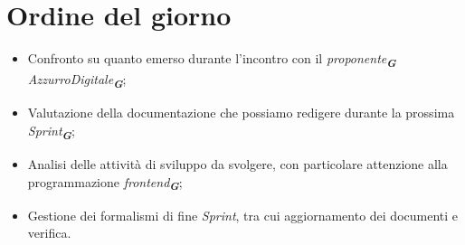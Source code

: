 

\section{Ordine del giorno}

\begin{itemize}
    \item Confronto su quanto emerso durante l'incontro con il \emph{proponente}\textsubscript{\textit{\textbf{G}}} \emph{AzzurroDigitale}\textsubscript{\textit{\textbf{G}}};
    \item Valutazione della documentazione che possiamo redigere durante la prossima \emph{Sprint}\textsubscript{\textit{\textbf{G}}};
    \item Analisi delle attività di sviluppo da svolgere, con particolare attenzione alla programmazione \emph{frontend}\textsubscript{\textit{\textbf{G}}};
    \item Gestione dei formalismi di fine \emph{Sprint}, tra cui aggiornamento dei documenti e verifica.
\end{itemize}